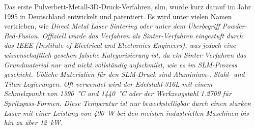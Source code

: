 \documentclass[../main.tex]{subfiles}
\begin{document}
Das erste Pulverbett-Metall-3D-Druck-Verfahren, \acrfull{slm}, wurde kurz darauf im Jahr 1995 in Deutschland entwickelt und patentiert. Es wird unter vielen Namen vertrieben, wie \it{Direct Metal Laser Sintering} oder unter dem Überbegriff \it{Powder-Bed-Fusion}. Offiziell wurde das Verfahren als Sinter-Verfahren eingestuft durch das IEEE (\it{Institute of Electrical and Electronics Engineers}), was jedoch eine wissenschaftlich gesehen falsche Kategorisierung ist, da ein Sinter-Verfahren das Grundmaterial nur  und nicht vollständig aufschmilzt, wie es im SLM-Prozess geschieht. \parencite{SINTER_SMELT} Übliche Materialien für den SLM-Druck sind Aluminium-, Stahl- und Titan-Legierungen. Oft verwendet wird der Edelstahl 316L mit einem Schmelzpunkt von \qty{1390}{\celsius} und \qty{1440}{\degreeCelsius} \parencite{610LSTEEL} oder der Werkzeugstahl 1.2709 für Spritzguss-Formen. \parencite{steel12709} Diese Temperatur ist nur bewerkstelligbar durch einen starken Laser mit einer Leistung von \qty{400}{\watt} bei den meisten industriellen Maschinen bis hin zu über \qty{12}{\kilo\watt}.
\end{document}

